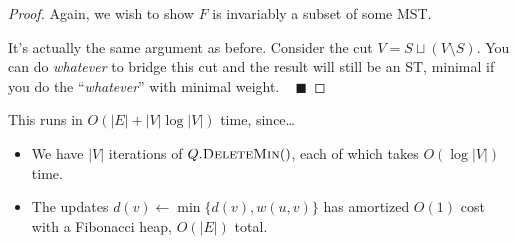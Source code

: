 \begin{proof}
    Again, we wish to show $F$ is invariably a subset of some MST.

    It's actually the same argument as before.  Consider the cut $V = S \sqcup (V \setminus S)$.  You can do \emph{whatever} to bridge this cut and the result will still be an ST, minimal if you do the ``\emph{whatever}'' with minimal weight. ~ $\blacksquare$
\end{proof}

This runs in $O(|E| + |V|\log |V|)$ time, since\dots
\begin{itemize}
    \item We have $|V|$ iterations of $Q.\textsc{DeleteMin}()$, each of which takes $O(\log |V|)$ time.
    \item The updates $d(v) \leftarrow \min \{d(v), w(u, v)\}$ has amortized $O(1)$ cost with a Fibonacci heap, $O(|E|)$ total.
\end{itemize}

